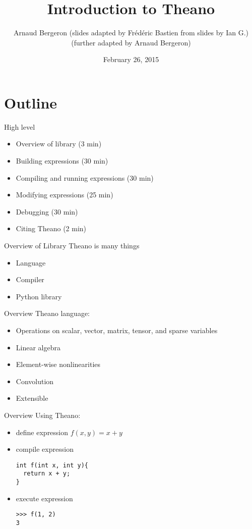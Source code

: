 \documentclass[utf8x]{beamer}
\title{Introduction to Theano}
\author{%
\footnotesize
Arnaud Bergeron \newline
(slides adapted by Frédéric Bastien from slides by Ian G.) \newline
(further adapted by Arnaud Bergeron)
}
\date{February 26, 2015}
\begin{document}
\begin{frame}[plain]
 \titlepage
\end{frame}

\section{Outline}
\begin{frame}{High level}\setcounter{page}{1}
  \begin{itemize}
  \item Overview of library (3 min)
  \item Building expressions (30 min)
  \item Compiling and running expressions (30 min)
  \item Modifying expressions (25 min)
  \item Debugging (30 min)
  \item Citing Theano (2 min)
  \end{itemize}
\end{frame}


\begin{frame}{Overview of Library}
  Theano is many things
  \begin{itemize}
  \item Language
  \item Compiler
  \item Python library
  \end{itemize}
\end{frame}

\begin{frame}{Overview}
  Theano language:
  \begin{itemize}
  \item Operations on scalar, vector, matrix, tensor, and sparse variables
  \item Linear algebra
  \item Element-wise nonlinearities
  \item Convolution
  \item Extensible
  \end{itemize}
\end{frame}

\begin{frame}[fragile]{Overview}
  Using Theano:
  \begin{itemize}
  \item define expression $f(x,y) = x + y$
  \item compile expression
\begin{lstlisting}
int f(int x, int y){
  return x + y;
}
\end{lstlisting}

  \item execute expression
\begin{lstlisting}
>>> f(1, 2)
3
\end{lstlisting}
  \end{itemize}
\end{frame}
\end{document}

